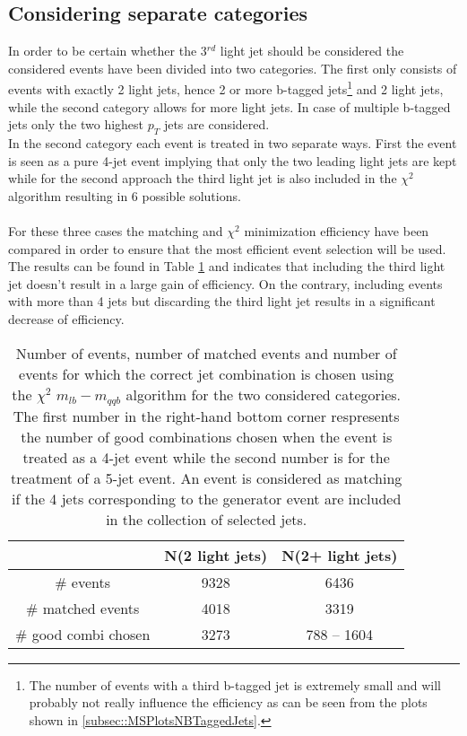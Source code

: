 \documentclass[a4paper,12pt]{report}
\begin{document}
\subsection{Considering separate categories}
In order to be certain whether the 3$^{rd}$ light jet should be considered the considered events have been divided into two categories. The first only consists of events with exactly 2 light jets, hence 2 or more b-tagged jets\footnote{The number of events with a third b-tagged jet is extremely small and will probably not really influence the efficiency as can be seen from the plots shown in \ref{subsec::MSPlotsNBTaggedJets}.} and 2 light jets, while the second category allows for more light jets. In case of multiple b-tagged jets only the two highest $p_T$ jets are considered.\\
In the second category each event is treated in two separate ways. First the event is seen as a pure 4-jet event implying that only the two leading light jets are kept while for the second approach the third light jet is also included in the $\chi^{2}$ algorithm resulting in 6 possible solutions.\\ \\
For these three cases the matching and $\chi^{2}$ minimization efficiency have been compared in order to ensure that the most efficient event selection will be used. The results can be found in Table \ref{table::LightJetCategories} and indicates that including the third light jet doesn't result in a large gain of efficiency. On the contrary, including events with more than 4 jets but discarding the third light jet results in a significant decrease of efficiency.

\begin{table}[!h]
 \centering
 \begin{tabular}{c|c|c}
                         & N(2 light jets) & N(2+ light jets)  \\
  \hline
  $\#$ events            & 9328            & 6436 \\
  $\#$ matched events    & 4018            & 3319 \\
  $\#$ good combi chosen & 3273            & 788 -- 1604
 \end{tabular}
 \caption{Number of events, number of matched events and number of events for which the correct jet combination is chosen using the $\chi^{2}$ $m_{lb} - m_{qqb}$ algorithm for the two considered categories. The first number in the right-hand bottom corner respresents the number of good combinations chosen when the event is treated as a 4-jet event while the second number is for the treatment of a 5-jet event. An event is considered as matching if the 4 jets corresponding to the generator event are included in the collection of selected jets.}\label{table::LightJetCategories}
\end{table}
\end{document}
